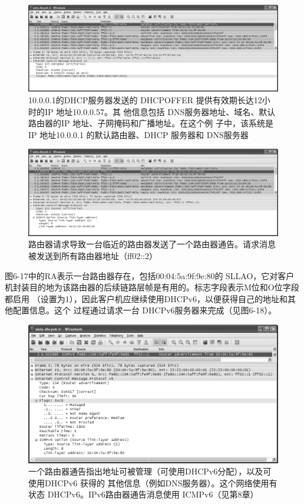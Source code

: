 \begin{figure}[H]
  \centering
  \includegraphics[scale=0.5]{imgs/6/6-15.png}
  \caption{10.0.0.1的DHCP服务器发送的 DHCPOFFER 提供有效期长达12小时的IP 地址10.0.0.57。其
    他信息包括 DNS服务器地址、域名、默认路由器的IP 地址、子网掩码和广播地址。在这个例
  子中，该系统是 IP 地址10.0.0.1 的默认路由器、DHCP 服务器和 DNS服务器}
\end{figure}

\begin{figure}[H]
  \centering
  \includegraphics[scale=0.5]{imgs/6/6-16.png}
  \caption{路由器请求导致一台临近的路由器发送了一个路由器通告。请求消息被发送到所有路由器地址（ff02::2）}
\end{figure}

图6-17中的RA表示一台路由器存在，包括00:04:5a:9f:9e:80的 SLLAO，它对客户
机封装目的地为该路由器的后续链路层帧是有用的。标志字段表示M位和O位字段都启用
（设置为1），因此客户机应继续使用DHCPv6，以便获得自己的地址和其他配置信息。这个
过程通过请求一台 DHCPv6服务器来完成（见图6-18）。

\begin{figure}[H]
  \centering
  \includegraphics[scale=0.5]{imgs/6/6-17.png}
  \caption{一个路由器通告指出地址可被管理（可使用DHCPv6分配），以及可使用DHCPv6 获得的
    其他信息（例如DNS服务器）。这个网络使用有状态 DHCPv6。IPv6路由器通告消息使用
  ICMPv6（见第8章）}
\end{figure}


